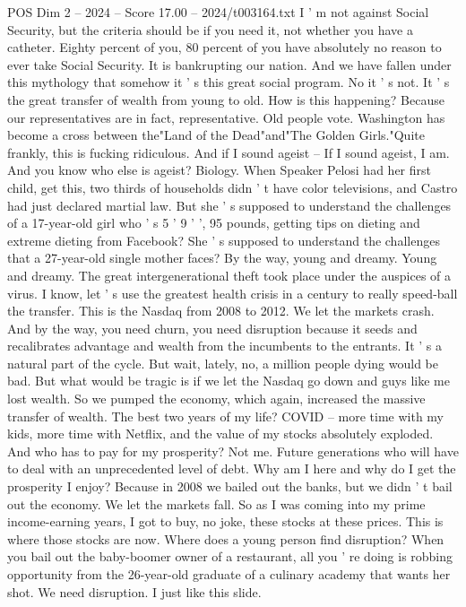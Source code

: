 \begin{textsample}{POS Dim 2 – 2024 – Score 17.00 – 2024/t003164.txt}
I ' m not against Social Security, but the criteria should be if you need it, not whether you have a catheter.
Eighty percent of you, 80 percent of you have absolutely no reason to ever take Social Security.
It is bankrupting our nation.
And we have fallen under this mythology that somehow it ' s this great social program.
No it ' s not.
It ' s the great transfer of wealth from young to old.
How is this happening?
Because our representatives are in fact, representative.
Old people vote.
Washington has become a cross between the"Land of the Dead"and"The Golden Girls."Quite frankly, this is fucking ridiculous.
And if I sound ageist -- If I sound ageist, I am.
And you know who else is ageist?
Biology.
When Speaker Pelosi had her first child, get this, two thirds of households didn ' t have color televisions, and Castro had just declared martial law.
But she ' s supposed to understand the challenges of a 17-year-old girl who ' s 5 ' 9 ' ', 95 pounds, getting tips on dieting and extreme dieting from Facebook?
She ' s supposed to understand the challenges that a 27-year-old single mother faces?
By the way, young and dreamy.
Young and dreamy.
The great intergenerational theft took place under the auspices of a virus.
I know, let ' s use the greatest health crisis in a century to really speed-ball the transfer.
This is the Nasdaq from 2008 to 2012.
We let the markets crash.
And by the way, you need churn, you need disruption because it seeds and recalibrates advantage and wealth from the incumbents to the entrants.
It ' s a natural part of the cycle.
But wait, lately, no, a million people dying would be bad.
But what would be tragic is if we let the Nasdaq go down and guys like me lost wealth.
So we pumped the economy, which again, increased the massive transfer of wealth.
The best two years of my life?
COVID -- more time with my kids, more time with Netflix, and the value of my stocks absolutely exploded.
And who has to pay for my prosperity?
Not me.
Future generations who will have to deal with an unprecedented level of debt.
Why am I here and why do I get the prosperity I enjoy?
Because in 2008 we bailed out the banks, but we didn ' t bail out the economy.
We let the markets fall.
So as I was coming into my prime income-earning years, I got to buy, no joke, these stocks at these prices.
This is where those stocks are now.
Where does a young person find disruption?
When you bail out the baby-boomer owner of a restaurant, all you ' re doing is robbing opportunity from the 26-year-old graduate of a culinary academy that wants her shot.
We need disruption.
I just like this slide.

\end{textsample}
